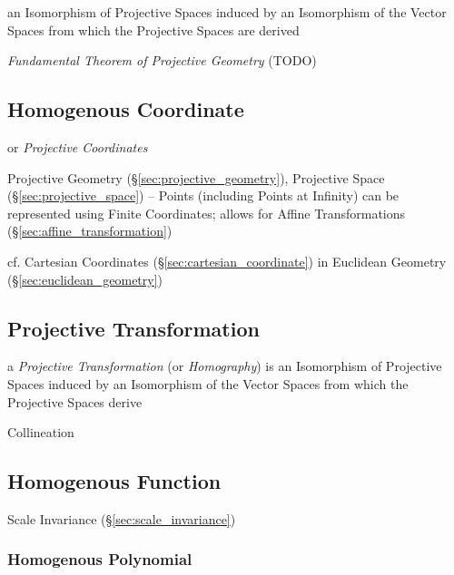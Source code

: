 an Isomorphism of Projective Spaces induced by an Isomorphism of the Vector
Spaces from which the Projective Spaces are derived

\emph{Fundamental Theorem of Projective Geometry} (TODO)



\subsection{Homogenous Coordinate}\label{sec:homogenous_coordinate}

or \emph{Projective Coordinates}

Projective Geometry (\S\ref{sec:projective_geometry}), Projective
Space (\S\ref{sec:projective_space}) -- Points (including Points at
Infinity) can be represented using Finite Coordinates; allows for
Affine Transformations (\S\ref{sec:affine_transformation})

cf. Cartesian Coordinates (\S\ref{sec:cartesian_coordinate}) in
Euclidean Geometry (\S\ref{sec:euclidean_geometry})



\subsection{Projective Transformation}
\label{sec:projective_transformation}

a \emph{Projective Transformation} (or \emph{Homography}) is an
Isomorphism of Projective Spaces induced by an Isomorphism of the
Vector Spaces from which the Projective Spaces derive

Collineation



\subsection{Homogenous Function}\label{sec:homogenous_function}

Scale Invariance (\S\ref{sec:scale_invariance})



\subsubsection{Homogenous Polynomial}\label{sec:homogenous_polynomial}

